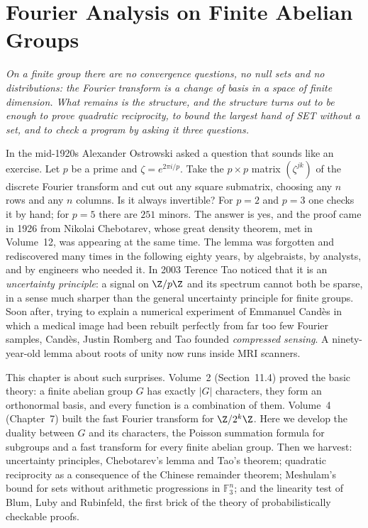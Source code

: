\chapter{Fourier Analysis on Finite Abelian Groups}

\begin{center}\itshape
On a finite group there are no convergence questions, no null sets and no distributions: the Fourier transform is a change of basis
in a space of finite dimension. What remains is the structure, and the structure turns out to be enough to prove quadratic
reciprocity, to bound the largest hand of SET without a set, and to check a program by asking it three questions.
\end{center}

In the mid-1920s Alexander Ostrowski asked a question that sounds like an exercise. Let $p$ be a prime and
$\zeta=e^{2\pi i/p}$. Take the $p\times p$ matrix $(\zeta^{jk})$ of the discrete Fourier transform and cut out any square submatrix,
choosing any $n$ rows and any $n$ columns. Is it always invertible? For $p=2$ and $p=3$ one checks it by hand; for $p=5$ there are
$251$ minors. The answer is yes, and the proof came in 1926 from Nikolai Chebotarev, whose great density theorem, met in Volume~12, was appearing
at the same time. The lemma was forgotten and rediscovered many times in the following eighty years, by algebraists, by analysts, and by engineers who needed it. In 2003 Terence Tao noticed that it is an
\emph{uncertainty principle}: a signal on $\Z/p\Z$ and its spectrum cannot both be sparse, in a sense much sharper than the general
uncertainty principle for finite groups. Soon after, trying to explain a numerical experiment of Emmanuel Cand\`es in which a
medical image had been rebuilt perfectly from far too few Fourier samples, Cand\`es, Justin Romberg and Tao founded \emph{compressed
sensing}. A ninety-year-old lemma about roots of unity now runs inside MRI scanners.

This chapter is about such surprises. Volume~2 (Section~11.4) proved the basic theory: a finite abelian group $G$ has exactly $|G|$
characters, they form an orthonormal basis, and every function is a combination of them. Volume~4 (Chapter~7) built the fast Fourier
transform for $\Z/2^k\Z$. Here we develop the duality between $G$ and its characters, the Poisson summation formula for subgroups and
a fast transform for every finite abelian group. Then we harvest: uncertainty principles, Chebotarev's lemma and Tao's theorem;
quadratic reciprocity as a consequence of the Chinese remainder theorem; Meshulam's bound for sets without arithmetic progressions in
$\mathbb F_3^n$; and the linearity test of Blum, Luby and Rubinfeld, the first brick of the theory of probabilistically checkable proofs.

